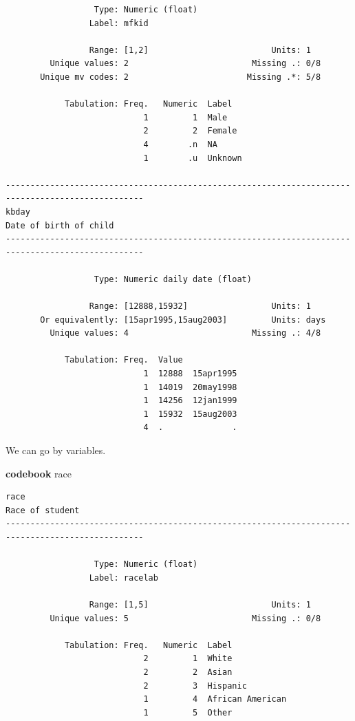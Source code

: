 \documentclass[
]{book}
\newenvironment{Shaded}{\begin{snugshade}}{\end{snugshade}}
\newcommand{\KeywordTok}[1]{\textcolor[rgb]{0.13,0.29,0.53}{\textbf{#1}}}
\newcommand{\NormalTok}[1]{#1}
\begin{document}
\begin{verbatim}
                  Type: Numeric (float)
                 Label: mfkid

                 Range: [1,2]                         Units: 1
         Unique values: 2                         Missing .: 0/8
       Unique mv codes: 2                        Missing .*: 5/8

            Tabulation: Freq.   Numeric  Label
                            1         1  Male
                            2         2  Female
                            4        .n  NA
                            1        .u  Unknown

--------------------------------------------------------------------------------------------------
kbday                                                                       Date of birth of child
--------------------------------------------------------------------------------------------------

                  Type: Numeric daily date (float)

                 Range: [12888,15932]                 Units: 1
       Or equivalently: [15apr1995,15aug2003]         Units: days
         Unique values: 4                         Missing .: 4/8

            Tabulation: Freq.  Value
                            1  12888  15apr1995
                            1  14019  20may1998
                            1  14256  12jan1999
                            1  15932  15aug2003
                            4  .              .
\end{verbatim}

We can go by variables.

\begin{Shaded}
\begin{Highlighting}[]
\KeywordTok{codebook}\NormalTok{ race}
\end{Highlighting}
\end{Shaded}

\begin{verbatim}
race                                                                               Race of student
--------------------------------------------------------------------------------------------------

                  Type: Numeric (float)
                 Label: racelab

                 Range: [1,5]                         Units: 1
         Unique values: 5                         Missing .: 0/8

            Tabulation: Freq.   Numeric  Label
                            2         1  White
                            2         2  Asian
                            2         3  Hispanic
                            1         4  African American
                            1         5  Other
\end{verbatim}
\end{document}
